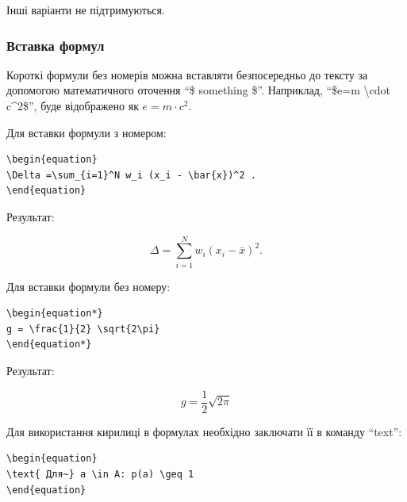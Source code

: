 Інші варіанти не підтримуються.

\subsubsection{Вставка формул}

Короткі формули без номерів можна вставляти безпосередньо до тексту за допомогою
математичного оточення \enquote{\$ something \$}. Наприклад, \enquote{{\$}e=m
{\textbackslash}cdot c{\textasciicircum}2{\$}}, буде відображено як $e=m \cdot
c^2$.

Для вставки формули з номером:

\begin{framed}\small
\begin{lstlisting}
\begin{equation}
\Delta =\sum_{i=1}^N w_i (x_i - \bar{x})^2 .
\end{equation}
\end{lstlisting}
\end{framed}

Результат:

\begin{equation}
\Delta =\sum_{i=1}^N w_i (x_i - \bar{x})^2 .
\end{equation}

Для вставки формули без номеру:

\begin{framed}\small
\begin{lstlisting}
\begin{equation*}
g = \frac{1}{2} \sqrt{2\pi}
\end{equation*}
\end{lstlisting}
\end{framed}

Результат:

\begin{equation*}
g = \frac{1}{2} \sqrt{2\pi}
\end{equation*}

Для використання кирилиці в формулах необхідно заключати її в команду
\enquote{text}:

\begin{framed}\small
\begin{lstlisting}
\begin{equation}
\text{ Для~} a \in A: p(a) \geq 1
\end{equation}
\end{lstlisting}
\end{framed}

